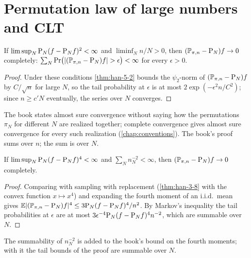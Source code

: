 \section{Permutation law of large numbers and CLT}

\begin{theorem}
  \label{thm:han-5-4-c1}
  If $\limsup_N\mathrm{P}_N(f-\mathrm{P}_N f)^2<\infty$ and $\liminf_Nn/N>0$, then $(\mathbb{P}_{\pi,n}-\mathrm{P}_N)f\to0$ completely: $\sum_N\Pr\bigl(|(\Ppin-\PN)f|>\epsilon\bigr)<\infty$ for every $\epsilon>0$.
\end{theorem}
\begin{proof}
  Under these conditions \cref{thm:han-5-2} bounds the $\psi_2$-norm of $(\mathbb{P}_{\pi,n}-\mathrm{P}_N)f$ by $C/\sqrt n$ for large $N$, so the tail probability at $\epsilon$ is at most $2\exp(-\epsilon^2n/C^2)$; since $n\ge c'N$ eventually, the series over $N$ converges.
\end{proof}
\begin{remark}
  The book states almost sure convergence without saying how the permutations $\pi_N$ for different $N$ are realized together; complete convergence gives almost sure convergence for every such realization (\cref{chap:conventions}). The book's proof sums over $n$; the sum is over $N$.
\end{remark}

\begin{theorem}
  \label{thm:han-5-4-c2}
  If $\limsup_N\mathrm{P}_N(f-\mathrm{P}_N f)^4<\infty$ and $\sum_Nn_N^{-2}<\infty$, then $(\mathbb{P}_{\pi,n}-\mathrm{P}_N)f\to0$ completely.
\end{theorem}
\begin{proof}
  Comparing with sampling with replacement (\cref{thm:han-3-8} with the convex function $x\mapsto x^4$) and expanding the fourth moment of an i.i.d.\ mean gives $\mathbb{E}|(\mathbb{P}_{\pi,n}-\mathrm{P}_N)f|^4\le3\mathrm{P}_N(f-\mathrm{P}_N f)^4/n^2$. By Markov's inequality the tail probabilities at $\epsilon$ are at most $3\epsilon^{-4}\mathrm{P}_N(f-\mathrm{P}_N f)^4n^{-2}$, which are summable over $N$.
\end{proof}
\begin{remark}
  The summability of $n_N^{-2}$ is added to the book's bound on the fourth moments; with it the tail bounds of the proof are summable over $N$.
\end{remark}

